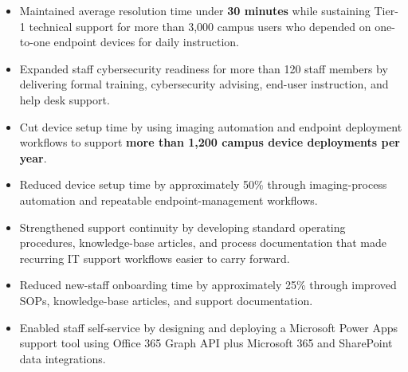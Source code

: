 \par\smallskip
\noindent
\begin{minipage}[t]{20cm}%
  \begin{minipage}[t]{9.75cm}%
    \begin{itemize}
      \item Maintained average resolution time under \textbf{30 minutes} while sustaining Tier-1 technical support for more than 3,000 campus users who depended on one-to-one endpoint devices for daily instruction.
      \item Expanded staff cybersecurity readiness for more than 120 staff members by delivering formal training, cybersecurity advising, end-user instruction, and help desk support.
      \item Cut device setup time by using imaging automation and endpoint deployment workflows to support \textbf{more than 1,200 campus device deployments per year}.
      \item Reduced device setup time by approximately 50\% through imaging-process automation and repeatable endpoint-management workflows.
      \item Strengthened support continuity by developing standard operating procedures, knowledge-base articles, and process documentation that made recurring IT support workflows easier to carry forward.
      \item Reduced new-staff onboarding time by approximately 25\% through improved SOPs, knowledge-base articles, and support documentation.
    \end{itemize}
  \end{minipage}%
  \hfill%
  \begin{minipage}[t]{9.75cm}%
    \begin{itemize}
      \item Enabled staff self-service by designing and deploying a Microsoft Power Apps support tool using Office 365 Graph API plus Microsoft 365 and SharePoint data integrations.

\end{itemize}
\end{minipage}
\end{minipage}

